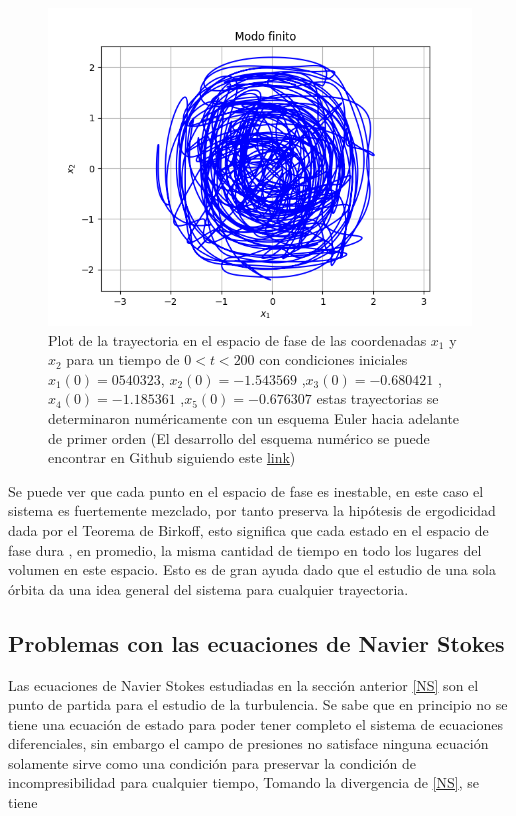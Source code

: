 \begin{figure}[H]
\centering
\includegraphics[scale =0.8]{FiniteMode1.png}
\caption{Plot de la trayectoria en el espacio de fase de las coordenadas $x_{1}$ y $x_{2}$ para un tiempo de $0<t<200$ con condiciones iniciales 
$x_{1}(0) = 0540323$, $x_{2}(0) = -1.543569$ ,$x_{3}(0) = -0.680421$ ,$x_{4}(0) = -1.185361$ ,$x_{5}(0) = -0.676307$
estas trayectorias se determinaron numéricamente con un esquema Euler hacia adelante  de primer orden (El desarrollo del esquema numérico se puede encontrar en Github siguiendo este  \href{https://github.com/GoSAUN/Hartmann/tree/master/Codes/FiniteMode}{link})}
\label{FiniteModel}
\end{figure}

\noindent Se puede ver que cada punto en el espacio de fase es inestable, en este caso el sistema es fuertemente mezclado, por tanto preserva la hipótesis de ergodicidad dada por el Teorema de Birkoff, esto significa que cada estado en el espacio de fase dura , en promedio, la misma cantidad de tiempo en todo los lugares del volumen en este espacio. Esto es de gran ayuda dado que el estudio de una sola órbita da una idea general del sistema para cualquier trayectoria.

\subsection{Problemas con las ecuaciones de Navier Stokes}

\noindent Las ecuaciones de Navier Stokes estudiadas en la sección anterior \eqref{NS}  son el punto de partida para el estudio de la turbulencia. Se sabe que en principio no se tiene una ecuación de estado para poder tener completo el sistema de ecuaciones diferenciales, sin embargo el campo de presiones no satisface ninguna ecuación solamente sirve como una condición para preservar la condición de incompresibilidad para cualquier tiempo, Tomando la divergencia de \eqref{NS}, se tiene 

